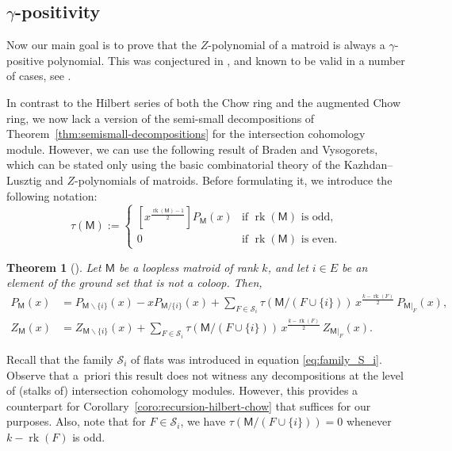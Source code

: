 \documentclass[11pt, a4paper, english]{amsart}
\theoremstyle{teoremas}
\newtheorem{theorem}{Theorem}[section]
\theoremstyle{definition}
\DeclareMathOperator{\rk}{rk}
\newcommand{\M}{\mathsf{M}}
\begin{document}
\subsection{\texorpdfstring{$\gamma$}{gamma}-positivity}

Now our main goal is to prove that the $Z$-polynomial of a matroid is always a $\gamma$-positive polynomial. This was conjectured in \cite[Conjecture 5.6]{ferroni-nasr-vecchi}, and known to be valid in a number of cases, see \cite[Theorem~1.9]{ferroni-nasr-vecchi}. 

In contrast to the Hilbert series of both the Chow ring and the augmented Chow ring, we now lack a version of the semi-small decompositions of Theorem~\ref{thm:semismall-decompositions} for the intersection cohomology module. However, we can use the following result of Braden and Vysogorets, which can be stated only using the basic combinatorial theory of the Kazhdan--Lusztig and $Z$-polynomials of matroids. Before formulating it, we introduce the following notation:
    \[ \tau(\M) := 
    \begin{cases}
        [x^{\frac{\rk(\M)-1}{2}}] P_{\M}(x) & \text{if $\rk(\M)$ is odd,}\\
        0 & \text{if $\rk(\M)$ is even.}
    \end{cases}
    \]

\begin{theorem}[{\cite[Theorem~2.8]{braden-vysogorets}}]
    Let $\M$ be a loopless matroid of rank $k$, and let $i\in E$ be an element of the ground set that is not a coloop. Then,
    \begin{align*}
    P_{\M}(x) &= P_{\M\smallsetminus\{i\}}(x) - xP_{\M/\{i\}}(x) + \sum_{F\in\mathscr{S}_i} \tau\left(\M/{(F\cup\{i\})}\right)\, x^{\frac{k - \rk(F)}{2}}\, P_{\M|_F}(x),\\
     Z_{\M}(x) &= Z_{\M\smallsetminus\{i\}}(x) + \sum_{F\in\mathscr{S}_i} \tau\left(\M/{(F\cup\{i\})}\right)\, x^{\frac{k - \rk(F)}{2}}\, Z_{\M|_F}(x).
    \end{align*}
\end{theorem}

Recall that the family $\mathscr{S}_i$ of flats was introduced in equation \eqref{eq:family_S_i}. Observe that a~priori this result does not witness any decompositions at the level of (stalks of) intersection cohomology modules. However, this provides a counterpart for Corollary~\ref{coro:recursion-hilbert-chow} that suffices for our purposes. Also, note that for $F\in \mathscr{S}_i$, we have $\tau(\M/(F\cup\{i\}))=0$ whenever $k-\rk(F)$ is odd.
\end{document}
